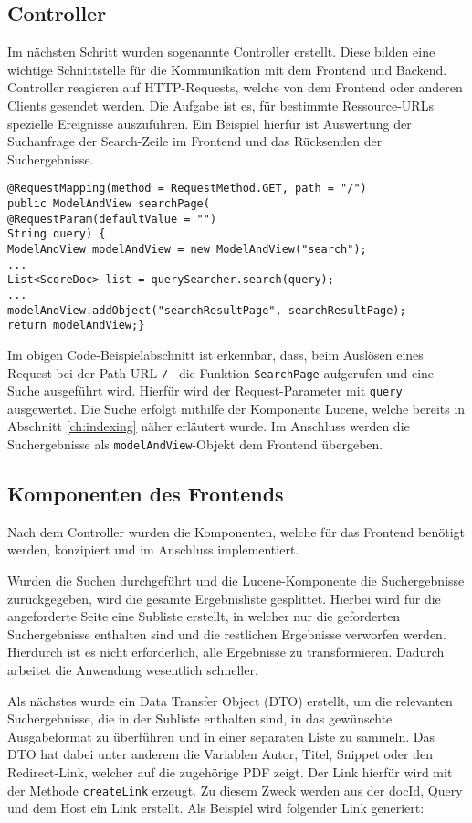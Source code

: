 \subsection{Controller}
Im nächsten Schritt wurden sogenannte Controller erstellt.
Diese bilden eine wichtige Schnittstelle für die Kommunikation mit dem Frontend und Backend.
Controller reagieren auf HTTP-Requests, welche von dem Frontend oder anderen Clients gesendet werden.
Die Aufgabe ist es, für bestimmte Ressource-URLs spezielle Ereignisse auszuführen.
Ein Beispiel hierfür ist Auswertung der Suchanfrage der Search-Zeile im Frontend  und das Rücksenden der Suchergebnisse.
\begin{lstlisting}
@RequestMapping(method = RequestMethod.GET, path = "/")
public ModelAndView searchPage(
@RequestParam(defaultValue = "")
String query) {
ModelAndView modelAndView = new ModelAndView("search");
...
List<ScoreDoc> list = querySearcher.search(query);
...
modelAndView.addObject("searchResultPage", searchResultPage);
return modelAndView;}
\end{lstlisting}

Im obigen Code-Beispielabschnitt ist erkennbar, dass, beim Auslösen eines Request bei der Path-URL \texttt{\glqq/\grqq~} die Funktion \texttt{SearchPage} aufgerufen und eine Suche ausgeführt wird.
Hierfür wird der Request-Parameter mit \texttt{query} ausgewertet.
Die Suche erfolgt mithilfe der Komponente Lucene, welche bereits in Abschnitt \ref{ch:indexing} näher erläutert wurde.
Im Anschluss werden die Suchergebnisse als \texttt{modelAndView}-Objekt dem Frontend übergeben. 

\subsection{Komponenten des Frontends}
Nach dem Controller wurden die Komponenten, welche für das Frontend benötigt werden, konzipiert und im Anschluss implementiert. 

Wurden die Suchen durchgeführt und die Lucene-Komponente die Suchergebnisse zurückgegeben, wird die gesamte Ergebnisliste gesplittet.
Hierbei wird für die angeforderte Seite eine Subliste erstellt, in welcher nur die geforderten Suchergebnisse enthalten sind und die restlichen Ergebnisse verworfen werden.
Hierdurch ist es nicht erforderlich, alle Ergebnisse zu transformieren.
Dadurch arbeitet die Anwendung wesentlich schneller.

Als nächstes wurde ein Data Transfer Object (DTO) erstellt, um die relevanten Suchergebnisse, die in der Subliste enthalten sind, in das gewünschte Ausgabeformat zu überführen und in einer separaten  Liste zu sammeln.
Das DTO hat dabei unter anderem die Variablen Autor, Titel, Snippet oder den Redirect-Link, welcher auf die zugehörige PDF zeigt.   
Der Link hierfür wird mit der Methode \texttt{createLink} erzeugt.
Zu diesem Zweck werden aus der docId, Query und dem Host ein Link erstellt. 
Als Beispiel wird folgender Link generiert:


